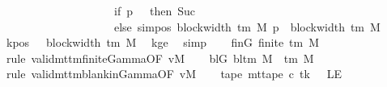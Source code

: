 \begin{isabellebody}
\ \ \ \ \ \ \ \ \ \ \ \ \ \ \ \ \ \ \ \ if\ p\ {\isacharequal}{\kern0pt}\ {}\ then\ Suc\ {}\isanewline
\ \ \ \ \ \ \ \ \ \ \ \ \ \ \ \ \ \ \ \ else\ sim{\isacharunderscore}{\kern0pt}pos\ {\isacharparenleft}{\kern0pt}block{\isacharunderscore}{\kern0pt}width\ {\isacharparenleft}{\kern0pt}{\isasymGamma}{\isacharunderscore}{\kern0pt}tm\ M{\isacharparenright}{\kern0pt}{\isacharparenright}{\kern0pt}\ p\ {\isacharplus}{\kern0pt}\ block{\isacharunderscore}{\kern0pt}width\ {\isacharparenleft}{\kern0pt}{\isasymGamma}{\isacharunderscore}{\kern0pt}tm\ M{\isacharparenright}{\kern0pt}{\isacharparenright}{\kern0pt}{\isachardoublequoteclose}\isanewline
%
\isadelimproof
%
\endisadelimproof
%
\isatagproof
{}\isamarkupfalse%
\ {\isacharminus}{\kern0pt}\isanewline
\ \ \isamarkupfalse%
\ kpos{\isacharcolon}{\kern0pt}\ {\isachardoublequoteopen}{}\ {\isacharless}{\kern0pt}\ block{\isacharunderscore}{\kern0pt}width\ {\isacharparenleft}{\kern0pt}{\isasymGamma}{\isacharunderscore}{\kern0pt}tm\ M{\isacharparenright}{\kern0pt}{\isachardoublequoteclose}\ \isamarkupfalse%
\ kge{}\ \isamarkupfalse%
\ simp\isanewline
\ \ \isamarkupfalse%
\ finG{\isacharcolon}{\kern0pt}\ {\isachardoublequoteopen}finite\ {\isacharparenleft}{\kern0pt}{\isasymGamma}{\isacharunderscore}{\kern0pt}tm\ M{\isacharparenright}{\kern0pt}{\isachardoublequoteclose}\ \isamarkupfalse%
\ {\isacharparenleft}{\kern0pt}rule\ valid{\isacharunderscore}{\kern0pt}mttm{\isacharunderscore}{\kern0pt}finite{\isacharunderscore}{\kern0pt}Gamma{\isacharbrackleft}{\kern0pt}OF\ vM{\isacharbrackright}{\kern0pt}{\isacharparenright}{\kern0pt}\isanewline
\ \ \isamarkupfalse%
\ blG{\isacharcolon}{\kern0pt}\ {\isachardoublequoteopen}bl{\isacharunderscore}{\kern0pt}tm\ M\ {\isasymin}\ {\isasymGamma}{\isacharunderscore}{\kern0pt}tm\ M{\isachardoublequoteclose}\ \isamarkupfalse%
\ {\isacharparenleft}{\kern0pt}rule\ valid{\isacharunderscore}{\kern0pt}mttm{\isacharunderscore}{\kern0pt}blank{\isacharunderscore}{\kern0pt}in{\isacharunderscore}{\kern0pt}Gamma{\isacharbrackleft}{\kern0pt}OF\ vM{\isacharbrackright}{\kern0pt}{\isacharparenright}{\kern0pt}\isanewline
\ \ \isamarkupfalse%
\ tape{}{\isacharcolon}{\kern0pt}\ {\isachardoublequoteopen}mt{\isacharunderscore}{\kern0pt}tape\ c{\isacharprime}{\kern0pt}\ tk\ {}\ {\isacharequal}{\kern0pt}\ LE{}{\isachardoublequoteclose}\isanewline
\ \ \ \ \isamarkupfalse%

\end{isabellebody}
